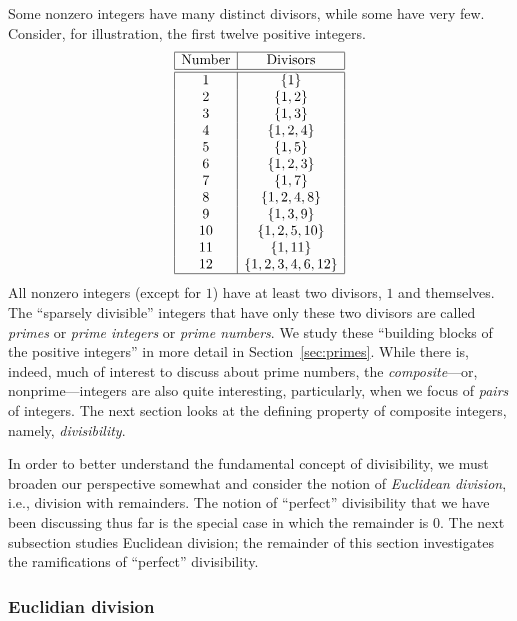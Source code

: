Some nonzero integers have many distinct divisors, while some have very few.  Consider, for illustration, the first twelve positive integers.
\[ \begin{array}{|c|c|}
\hline
\mbox{Number} & \mbox{Divisors} \\
\hline
\hline
1  &  \{ 1 \} \\
2  &  \{ 1, 2 \} \\
3  &  \{ 1, 3 \} \\
4  &  \{ 1, 2, 4 \} \\
5  &  \{ 1, 5 \} \\
6  &  \{ 1, 2, 3 \} \\
7  &  \{ 1, 7 \} \\
8  &  \{ 1, 2, 4, 8 \} \\
9  &  \{ 1, 3, 9 \} \\
10  & \{ 1, 2, 5, 10 \} \\
11  & \{ 1, 11 \} \\
12  & \{ 1, 2, 3, 4, 6, 12 \} \\
\hline
\end{array}
\]
All nonzero integers (except for $1$) have at least two divisors, $1$ and themselves.  The ``sparsely divisible'' integers that have only these two divisors are called {\it primes} or {\it prime  integers} or {\it prime numbers}.  We study these ``building blocks of the positive integers'' in more detail in Section~\ref{sec:primes}.  While there is, indeed, much of interest to discuss about prime numbers, the {\it composite}---or, nonprime---integers are also quite interesting, particularly, when we focus of {\em pairs} of integers.  The next section looks at the defining property of composite integers, namely, {\em divisibility}.

  

\medskip


In order to better understand the fundamental concept of divisibility, we must broaden our perspective somewhat and consider the notion of {\em Euclidean division}, i.e., division with remainders.  The notion of ``perfect'' divisibility that we have been discussing thus far is the special case in which the remainder is $0$.  The next subsection studies Euclidean division; the remainder of this section investigates the ramifications of ``perfect'' divisibility.

\subsubsection{Euclidian division}
\label{sec:euclidian}
   

